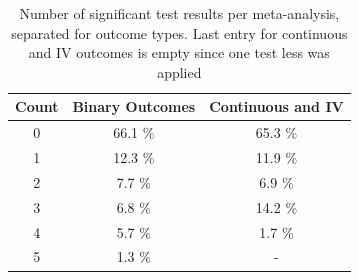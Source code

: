 \documentclass[11pt,a4paper,twoside]{book}\usepackage[]{graphicx}\usepackage[]{color}
\begin{document}
\begin{table}[ht]
\centering
\begingroup\footnotesize
\begin{tabular}{ccc}
  \hline
Count & Binary Outcomes & Continuous and IV \\ 
  \hline
0 & 66.1 \% & 65.3 \% \\ 
  1 & 12.3 \% & 11.9 \% \\ 
  2 & 7.7 \% & 6.9 \% \\ 
  3 & 6.8 \% & 14.2 \% \\ 
  4 & 5.7 \% & 1.7 \% \\ 
  5 & 1.3 \% & - \\ 
   \hline
\end{tabular}
\endgroup
\caption{Number of significant test results per meta-analysis, separated
       for outcome types. Last entry for continuous and IV outcomes is empty since one test less was 
       applied} 
\label{number.sig.tests}
\end{table}
\end{document}
